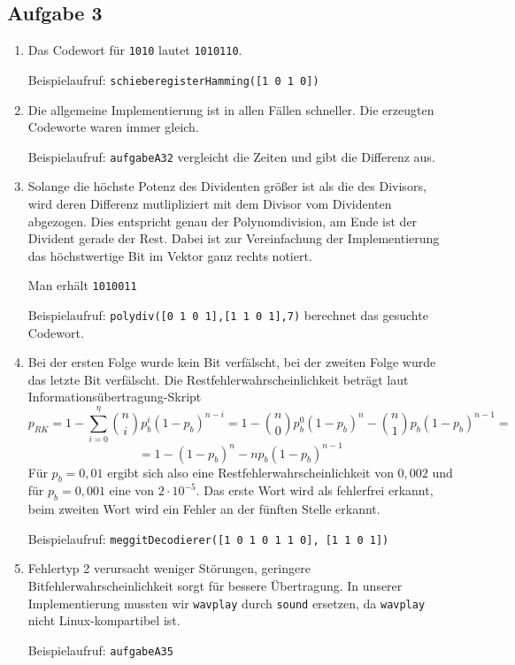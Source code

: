 \documentclass[a4paper,10pt]{scrartcl}
\begin{document}
\subsection*{Aufgabe 3}
\begin{enumerate}
 \item Das Codewort für \texttt{1010} lautet \texttt{1010110}.

Beispielaufruf: \texttt{schieberegisterHamming([1 0 1 0])}
 \item Die allgemeine Implementierung ist in allen Fällen schneller. Die erzeugten Codeworte waren immer gleich.

Beispielaufruf: \texttt{aufgabeA32} vergleicht die Zeiten und gibt die Differenz aus.
 \item Solange die höchste Potenz des Dividenten größer ist als die des Divisors, wird deren Differenz mutlipliziert mit dem Divisor vom Dividenten abgezogen. Dies entspricht genau der Polynomdivision, am Ende ist der Divident gerade der Rest. Dabei ist zur Vereinfachung der Implementierung das höchstwertige Bit im Vektor ganz rechts notiert.

Man erhält \texttt{1010011}

Beispielaufruf: \texttt{polydiv([0 1 0 1],[1 1 0 1],7)} berechnet das gesuchte Codewort.
 \item Bei der ersten Folge wurde kein Bit verfälscht, bei der zweiten Folge wurde das letzte Bit verfälscht. Die Restfehlerwahrscheinlichkeit beträgt laut Informationsübertragung-Skript
	\[ p_{RK} = 1 - \sum_{i=0}^\eta { n \choose i } p_b^i(1-p_b)^{n-i} = 1 - { n \choose 0 } p_b^0(1-p_b)^n - { n \choose 1 } p_b (1-p_b)^{n-1} = \]
	\[ = 1 - (1 - p_b)^n - n p_b (1-p_b)^{n-1} \]
	Für \(p_b = 0,01\) ergibt sich also eine Restfehlerwahrscheinlichkeit von \(0,002\) und für \(p_b = 0,001\) eine von \(2 \cdot 10^{-5}\). Das erste Wort wird als fehlerfrei erkannt, beim zweiten Wort wird ein Fehler an der fünften Stelle erkannt.

Beispielaufruf: \texttt{meggitDecodierer([1 0 1 0 1 1 0], [1 1 0 1])}
 \item Fehlertyp 2 verursacht weniger Störungen, geringere Bitfehlerwahrscheinlichkeit sorgt für bessere Übertragung. In unserer Implementierung mussten wir \texttt{wavplay} durch \texttt{sound} ersetzen, da \texttt{wavplay} nicht Linux-kompartibel ist.

Beispielaufruf: \texttt{aufgabeA35}
\end{enumerate}
\end{document}
